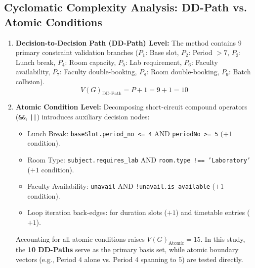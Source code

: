 \documentclass[11pt,a4paper]{article}
\begin{document}
\subsection{Cyclomatic Complexity Analysis: DD-Path vs. Atomic Conditions}
\begin{enumerate}
    \item \textbf{Decision-to-Decision Path (DD-Path) Level:}
    The method contains 9 primary constraint validation branches ($P_1$: Base slot, $P_2$: Period $>7$, $P_3$: Lunch break, $P_4$: Room capacity, $P_5$: Lab requirement, $P_6$: Faculty availability, $P_7$: Faculty double-booking, $P_8$: Room double-booking, $P_9$: Batch collision).
    \[
    V(G)_{\text{DD-Path}} = P + 1 = 9 + 1 = 10
    \]
    \item \textbf{Atomic Condition Level:}
    Decomposing short-circuit compound operators (\texttt{\&\&}, \texttt{||}) introduces auxiliary decision nodes:
    \begin{itemize}
        \item Lunch Break: \texttt{baseSlot.period\_no <= 4} AND \texttt{periodNo >= 5} ($+1$ condition).
        \item Room Type: \texttt{subject.requires\_lab} AND \texttt{room.type !== 'Laboratory'} ($+1$ condition).
        \item Faculty Availability: \texttt{unavail} AND \texttt{!unavail.is\_available} ($+1$ condition).
        \item Loop iteration back-edges: for duration slots ($+1$) and timetable entries ($+1$).
    \end{itemize}
    Accounting for all atomic conditions raises $V(G)_{\text{Atomic}} = 15$. In this study, the \textbf{10 DD-Paths} serve as the primary basis set, while atomic boundary vectors (e.g., Period 4 alone vs. Period 4 spanning to 5) are tested directly.
\end{enumerate}
\end{document}
